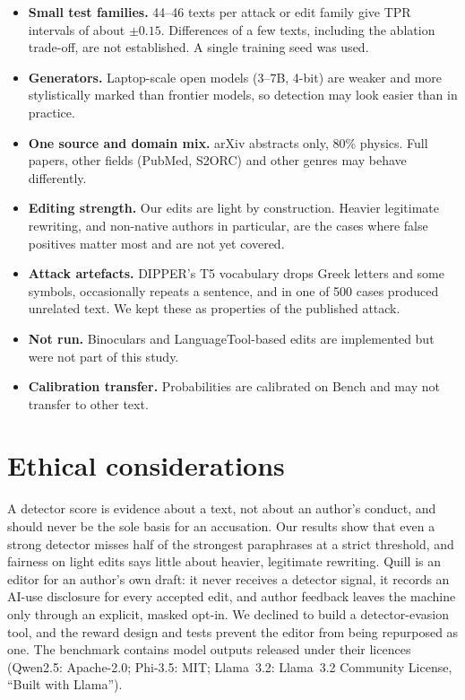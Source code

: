\documentclass[11pt]{article}
\begin{document}
\begin{itemize}
  \item \textbf{Small test families.} 44--46 texts per attack or edit family give TPR intervals of about $\pm0.15$. Differences of a few texts, including the ablation trade-off, are not established. A single training seed was used.
  \item \textbf{Generators.} Laptop-scale open models (3--7B, 4-bit) are weaker and more stylistically marked than frontier models, so detection may look easier than in practice.
  \item \textbf{One source and domain mix.} arXiv abstracts only, 80\% physics. Full papers, other fields (PubMed, S2ORC) and other genres may behave differently.
  \item \textbf{Editing strength.} Our edits are light by construction. Heavier legitimate rewriting, and non-native authors in particular, are the cases where false positives matter most and are not yet covered.
  \item \textbf{Attack artefacts.} DIPPER's T5 vocabulary drops Greek letters and some symbols, occasionally repeats a sentence, and in one of 500 cases produced unrelated text. We kept these as properties of the published attack.
  \item \textbf{Not run.} Binoculars and LanguageTool-based edits are implemented but were not part of this study.
  \item \textbf{Calibration transfer.} Probabilities are calibrated on Bench and may not transfer to other text.
\end{itemize}

\section{Ethical considerations}

A detector score is evidence about a text, not about an author's conduct, and should never be the sole basis for an accusation.
Our results show that even a strong detector misses half of the strongest paraphrases at a strict threshold, and fairness on light edits says little about heavier, legitimate rewriting.
Quill is an editor for an author's own draft: it never receives a detector signal, it records an AI-use disclosure for every accepted edit, and author feedback leaves the machine only through an explicit, masked opt-in.
We declined to build a detector-evasion tool, and the reward design and tests prevent the editor from being repurposed as one.
The benchmark contains model outputs released under their licences (Qwen2.5: Apache-2.0; Phi-3.5: MIT; Llama~3.2: Llama~3.2 Community License, ``Built with Llama'').
\end{document}

